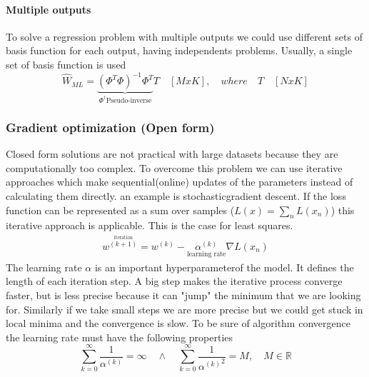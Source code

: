 \documentclass[main.tex]{subfiles}
\begin{document}
\paragraph{Multiple outputs} To solve a regression problem with multiple outputs we could use different sets of basis function for each output, having independents problems. Usually, a single set of basis function is used
\begin{equation}
    \hat{W}_{ML}=\underbrace{(\Phi^T\Phi)^{-1}\Phi^T}_{\Phi^{\dagger} \text{Pseudo-inverse}} T\quad [MxK],\quad where \quad T \quad [NxK]
\end{equation}

\subsubsection{Gradient optimization (Open form)}
Closed form solutions are not practical with large datasets because they are computationally too complex. To overcome this problem we can use iterative approaches which make sequential(online) updates of the parameters instead of calculating them directly. an example is stochastic\footnotemark gradient descent. 
If the loss function can be represented as a sum over samples ($L(x)=\sum_nL(x_n)$) this iterative approach is applicable. This is the case for least squares.
\begin{align}
    w^{\overset{\text{iteration}}{(k+1)}}=w^{(k)}-\underset{\text{learning rate}}{\alpha^{(k)}} \nabla L(x_n)
\end{align}
The learning rate $\alpha$ is an important hyperparameter\footnotemark {}of the model. It defines the length of each iteration step. A big step makes the iterative process converge faster, but is less precise because it can "jump" the minimum that we are looking for. Similarly if we take small steps we are more precise but we could get stuck in local minima and the convergence is slow. To be sure of algorithm convergence the learning rate must have the following properties
\begin{equation}
    \sum_{k=0}^{\infty}\frac{1}{\alpha^{(k)}}=\infty \quad \wedge \quad \sum_{k=0}^{\infty}\frac{1}{{\alpha^{(k)}}^2}=M, \quad M\in\mathbb{R}
\end{equation}
\end{document}
